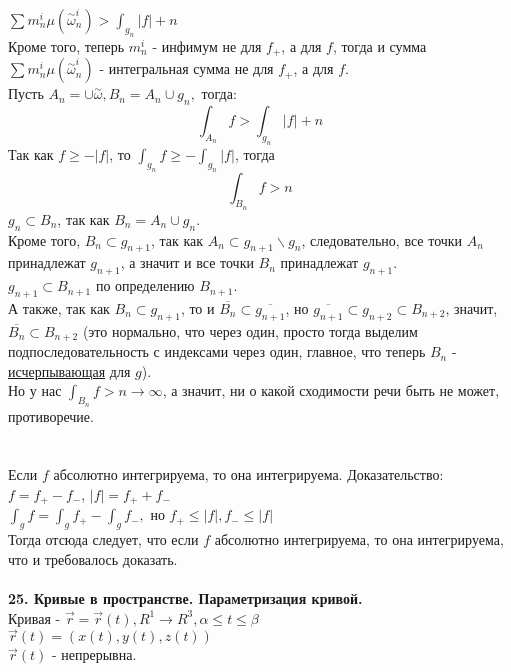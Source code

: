 \documentclass[12pt]{article}
\begin{document}
$\sum m_n^i \mu (\overset{\sim}{\omega}_n^i) > \int_{g_n} |f| + n$\\
Кроме того, теперь $m_n^i$ - инфимум не для $f_{+}$, а для $f$, тогда и сумма $\sum m_n^i \mu(\overset{\sim}{\omega}_n^i)$ - интегральная сумма не для $f_{+}$, а для $f$.\\
Пусть $A_n = \cup \overset{\sim}{\omega}, B_n = A_n \cup g_n,$ тогда:\\
$$\int_{A_n} f > \int_{g_n} |f| + n$$
Так как $f \geq -|f|$, то $\int_{g_n} f \geq -\int_{g_n} |f|$, тогда\\
$$\int_{B_n} f > n$$
$g_n \subset B_n$, так как $B_n = A_n \cup g_n$.\\
Кроме того, $B_n \subset g_{n+1}$, так как $A_n \subset g_{n+1} \backslash g_n$, следовательно, все точки $A_n$ принадлежат $g_{n+1}$, а значит и все точки $B_n$ принадлежат $g_{n+1}$.\\
$g_{n+1} \subset B_{n+1}$ по определению $B_{n+1}$.\\
А также, так как $B_n \subset g_{n+1}$, то и $\overline{B_n} \subset \overline{g_{n+1}}$, но $\overline{g_{n+1}} \subset g_{n+2} \subset B_{n+2}$, значит, $\overline{B_n} \subset B_{n+2}$ (это нормально, что через один, просто тогда выделим подпоследовательность с индексами через один, главное, что теперь $B_n$ - \hyperref[exhaustSeq]{исчерпывающая} для $g$).\\
Но у нас $\int_{B_n} f > n \to \infty$, а значит, ни о какой сходимости речи быть не может, противоречие.\\
\\
\\
Если $f$ абсолютно интегрируема, то она интегрируема. Доказательство:\\
$f = f_{+} - f_{-}$, $|f| = f_{+} + f_{-}$\\
$\int_g f = \int_g f_{+} - \int_g f_{-}, $ но $f_{+} \leq |f|, f_{-} \leq |f|$\\
Тогда отсюда следует, что если $f$ абсолютно интегрируема, то она интегрируема, что и требовалось доказать.\\
\\
\label{question25}\textbf{25. Кривые в пространстве. Параметризация кривой.}\\
Кривая - $\overrightarrow{r} = \overrightarrow{r}(t), R^1 \to R^3, \alpha \leq t \leq \beta$\\
$\overrightarrow{r}(t) = (x(t),y(t),z(t))$\\
$\overrightarrow{r}(t)$ - непрерывна.\\
\end{document}

